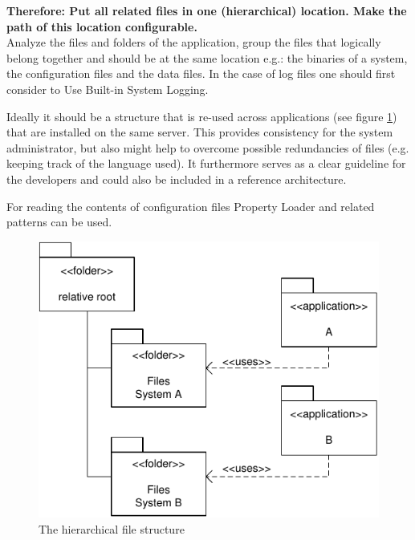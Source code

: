 \begin{center}
   
\end{center}

\textbf{Therefore: Put all related files in one (hierarchical) location. Make the path of this location configurable.}\\

Analyze the files and folders of the application, group the files that logically belong together and should be at the same location e.g.: the binaries of a system, the configuration files and the data files. In the case of log files one should first consider to {\sc Use Built-in System Logging}.

Ideally it should be a structure that is re-used across applications (see figure \ref{fig:singleFileLocationDiagram-01}) that are installed on the same server. This provides consistency for the system administrator, but also might help to overcome possible redundancies of files (e.g. keeping track of the language used). It furthermore serves as a clear guideline for the developers and could also be included in a reference architecture.

For reading the contents of configuration files {\sc Property Loader} and related patterns \cite{Wellhausen2010} can be used. 

\begin{figure}[h]
\centering
\includegraphics{patterns/singleFileLocationDiagram-01.pdf}
\caption{The hierarchical file structure}
\label{fig:singleFileLocationDiagram-01}
\end{figure}

